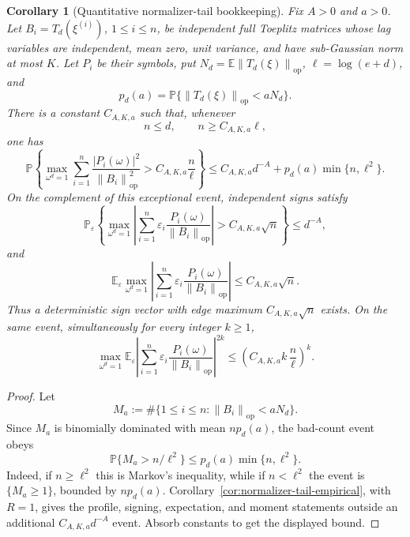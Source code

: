 \documentclass[11pt]{amsart}
\numberwithin{equation}{section}
\newtheorem{corollary}[theorem]{Corollary}
\theoremstyle{definition}
\theoremstyle{remark}
\newcommand{\op}{\mathrm{op}}
\newcommand{\Prob}{\mathbb P}
\newcommand{\Exp}{\mathbb E}
\newcommand{\norm}[1]{\left\lVert #1\right\rVert}
\newcommand{\abs}[1]{\left\lvert #1\right\rvert}
\newcommand{\eps}{\varepsilon}
\begin{document}
\begin{corollary}[Quantitative normalizer-tail bookkeeping]
\label{cor:normalizer-tail-quant}
Fix \(A>0\) and \(a>0\).  Let \(B_i=T_d(\xi^{(i)})\), \(1\le i\le n\), be
independent full Toeplitz matrices whose lag variables are independent, mean
zero, unit variance, and have sub-Gaussian norm at most \(K\).  Let \(P_i\) be
their symbols, put \(N_d=\Exp\norm{T_d(\xi)}_{\op}\),
\(\ell=\log(e+d)\), and
\[
  p_d(a)=\Prob\{\norm{T_d(\xi)}_{\op}<aN_d\}.
\]
There is a constant \(C_{A,K,a}\) such that, whenever
\[
  n\le d,\qquad n\ge C_{A,K,a}\ell ,
\]
one has
\[
  \Prob\left\{
  \max_{\omega^d=1}
  \sum_{i=1}^n
  \frac{\abs{P_i(\omega)}^2}{\norm{B_i}_{\op}^2}
  > C_{A,K,a}\frac n\ell
  \right\}
  \le C_{A,K,a}d^{-A}+p_d(a)\min\{n,\ell^2\}.
\]
On the complement of this exceptional event, independent signs satisfy
\[
  \Prob_\eps\left\{
  \max_{\omega^d=1}\left|\sum_{i=1}^n
  \eps_i\frac{P_i(\omega)}{\norm{B_i}_{\op}}\right|
  > C_{A,K,a}\sqrt n
  \right\}\le d^{-A},
\]
and
\[
  \Exp_\eps\max_{\omega^d=1}\left|\sum_{i=1}^n
  \eps_i\frac{P_i(\omega)}{\norm{B_i}_{\op}}\right|
  \le C_{A,K,a}\sqrt n .
\]
Thus a deterministic sign vector with edge maximum \(C_{A,K,a}\sqrt n\)
exists.  On the same event, simultaneously for every integer \(k\ge1\),
\[
  \max_{\omega^d=1}
  \Exp_\eps\left|\sum_{i=1}^n
  \eps_i\frac{P_i(\omega)}{\norm{B_i}_{\op}}\right|^{2k}
  \le
  \left(C_{A,K,a}k\,\frac n\ell\right)^k .
\]
\end{corollary}

\begin{proof}
Let
\[
  M_a:=\#\{1\le i\le n:\norm{B_i}_{\op}<aN_d\}.
\]
Since \(M_a\) is binomially dominated with mean \(np_d(a)\), the bad-count event
obeys
\[
  \Prob\{M_a>n/\ell^2\}\le p_d(a)\min\{n,\ell^2\}.
\]
Indeed, if \(n\ge\ell^2\) this is Markov's inequality, while if
\(n<\ell^2\) the event is \(\{M_a\ge1\}\), bounded by \(np_d(a)\).
Corollary~\ref{cor:normalizer-tail-empirical}, with \(R=1\), gives the profile,
signing, expectation, and moment statements outside an additional
\(C_{A,K,a}d^{-A}\) event.  Absorb constants to get the displayed bound.
\end{proof}
\end{document}
